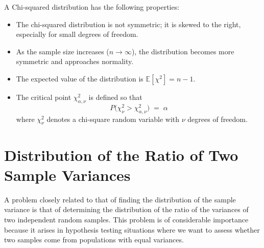 \documentclass[twoside]{book}
\begin{document}
\begin{center}
\end{center}

A Chi-squared distribution has the following properties:
\begin{itemize}
    \item The chi-squared distribution is not symmetric; it is skewed to the right, especially for small degrees of freedom.
    \item As the sample size increases (\( n \to \infty \)), the distribution becomes more symmetric and approaches normality.
    \item The expected value of the distribution is \( \mathbb{E}[\chi^2] = n-1 \).
    \item The critical point \(\chi^2_{\alpha,\nu}\) is defined so that
\[
P\bigl(\chi^2_\nu > \chi^2_{\alpha,\nu}\bigr) \;=\;\alpha
\]
where \(\chi^2_\nu\) denotes a chi-square random variable with \(\nu\) degrees of freedom.
\end{itemize}

\section{Distribution of the Ratio of Two Sample Variances}

A problem closely related to that of finding the distribution of the sample variance is that of determining the distribution of the ratio of the variances of two independent random samples. This problem is of considerable importance because it arises in hypothesis testing situations where we want to assess whether two samples come from populations with equal variances.
\end{document}
